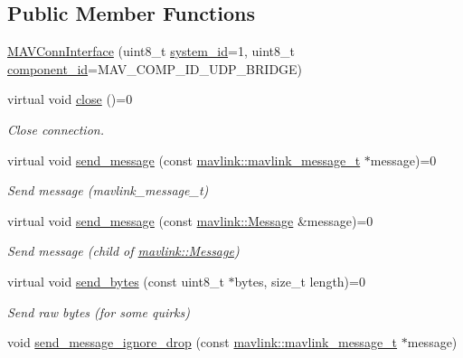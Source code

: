\subsection*{Public Member Functions}
\begin{DoxyCompactItemize}
\item 
\mbox{\hyperlink{group__mavconn_ga9b64f95099f1be0b41ae1dd459db63bc}{M\+A\+V\+Conn\+Interface}} (uint8\+\_\+t \mbox{\hyperlink{setHome_8cpp_a83150acb88d810ae6864b4c125324ed6}{system\+\_\+id}}=1, uint8\+\_\+t \mbox{\hyperlink{setHome_8cpp_adc84285d5da2c4fa9721d0a32d5e41a7}{component\+\_\+id}}=M\+A\+V\+\_\+\+C\+O\+M\+P\+\_\+\+I\+D\+\_\+\+U\+D\+P\+\_\+\+B\+R\+I\+D\+GE)
\item 
virtual void \mbox{\hyperlink{group__mavconn_ga7c1a5a89489e345a6621c327107293d8}{close}} ()=0
\begin{DoxyCompactList}\small\item\em Close connection. \end{DoxyCompactList}\item 
virtual void \mbox{\hyperlink{group__mavconn_gad807cf7e1935548e0c7ba94943cbb7aa}{send\+\_\+message}} (const \mbox{\hyperlink{include__v0_89_2mavlink__types_8h_a63b963764c09dc72f4910c1521e325b9}{mavlink\+::mavlink\+\_\+message\+\_\+t}} $\ast$message)=0
\begin{DoxyCompactList}\small\item\em Send message (mavlink\+\_\+message\+\_\+t) \end{DoxyCompactList}\item 
virtual void \mbox{\hyperlink{group__mavconn_ga204ee5ba0dc31519b0ea7a9ac50d486c}{send\+\_\+message}} (const \mbox{\hyperlink{structmavlink_1_1Message}{mavlink\+::\+Message}} \&message)=0
\begin{DoxyCompactList}\small\item\em Send message (child of \mbox{\hyperlink{structmavlink_1_1Message}{mavlink\+::\+Message}}) \end{DoxyCompactList}\item 
virtual void \mbox{\hyperlink{group__mavconn_ga7d00279e176e9a6890ed47ab1ceeb597}{send\+\_\+bytes}} (const uint8\+\_\+t $\ast$bytes, size\+\_\+t length)=0
\begin{DoxyCompactList}\small\item\em Send raw bytes (for some quirks) \end{DoxyCompactList}\item 
void \mbox{\hyperlink{group__mavconn_gabf049aebc9a9a9abfd36a1fb0034a433}{send\+\_\+message\+\_\+ignore\+\_\+drop}} (const \mbox{\hyperlink{include__v0_89_2mavlink__types_8h_a63b963764c09dc72f4910c1521e325b9}{mavlink\+::mavlink\+\_\+message\+\_\+t}} $\ast$message)

\end{DoxyCompactItemize}
